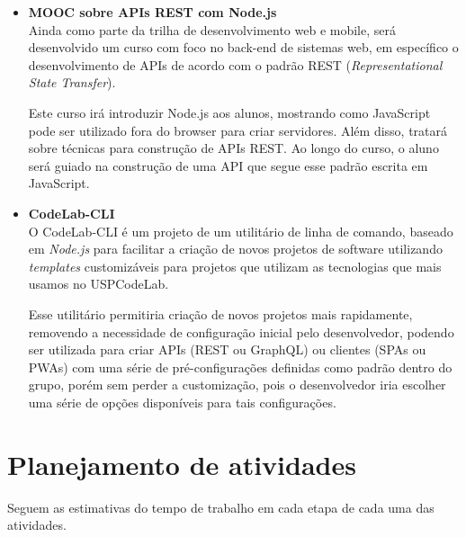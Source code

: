 \documentclass[10pt,twoside,a4paper]{article}
\begin{document}
\begin{itemize}
      \item \textbf{MOOC sobre APIs REST com Node.js}\\
        Ainda como parte da trilha de desenvolvimento web e mobile, será desenvolvido um curso com foco no back-end de sistemas web, em específico o desenvolvimento de APIs de acordo com o padrão REST (\textit{Representational State Transfer}).
        
        Este curso irá introduzir Node.js aos alunos, mostrando como JavaScript pode ser utilizado fora do browser para criar servidores. Além disso, tratará sobre técnicas para construção de APIs REST. Ao longo do curso, o aluno será guiado na construção de uma API que segue esse padrão escrita em JavaScript.
        
      \item \textbf{CodeLab-CLI}\\
        O CodeLab-CLI é um projeto de um utilitário de linha de comando, baseado em \textit{Node.js} para facilitar a criação de novos projetos de software utilizando \textit{templates} customizáveis para projetos que utilizam as tecnologias que mais usamos no USPCodeLab.
        
        Esse utilitário permitiria criação de novos projetos mais rapidamente, removendo a necessidade de configuração inicial pelo desenvolvedor, podendo ser utilizada para criar APIs (REST ou GraphQL) ou clientes (SPAs ou PWAs) com uma série de pré-configurações definidas como padrão dentro do grupo, porém sem perder a customização, pois o desenvolvedor iria escolher uma série de opções disponíveis para tais configurações.
        

    \end{itemize}
    
\section{Planejamento de atividades}
  
  Seguem as estimativas do tempo de trabalho em cada etapa de cada uma das atividades.
\end{document}
